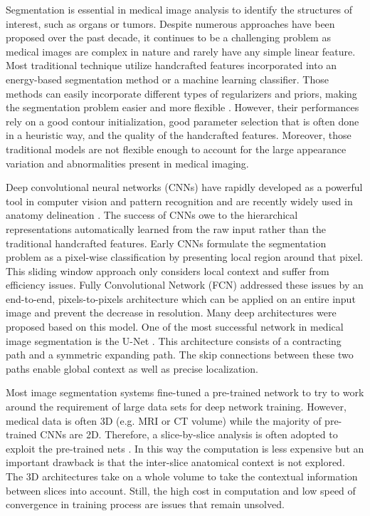 Segmentation is essential in medical image analysis to identify the structures of interest, such as organs or tumors.
Despite numerous approaches have been proposed over the past decade, it continues to be a challenging problem as medical images are complex in nature and rarely have any simple linear feature. 
Most traditional technique \cite{Boykov06GC,Caselles97geodesics,ChanVese01regions} utilize handcrafted features incorporated into an energy-based segmentation method or a machine learning classifier. Those methods can easily incorporate different types of regularizers and priors, making the segmentation problem easier and more flexible \cite{Cremers-et-al-ijcv07}. However, their performances rely on a good contour initialization, good parameter selection that is often done in a heuristic way, and the quality of the handcrafted features. Moreover, those traditional models are not flexible enough to account for the large appearance variation and abnormalities present in medical imaging. 

Deep convolutional neural networks (CNNs) have rapidly developed as a powerful tool in computer vision and pattern recognition and are recently widely used in anatomy delineation \cite{litjens2017survey}. The success of CNNs owe to the hierarchical representations automatically learned from the raw input rather than the traditional handcrafted features. 
Early CNNs formulate the segmentation problem as a pixel-wise classification by presenting local region around that pixel. This sliding window approach only considers local context and suffer from efficiency issues.
Fully Convolutional Network (FCN) \cite{long2015fully} addressed these issues by an end-to-end, pixels-to-pixels architecture which can be applied on an entire input image and prevent the decrease in resolution. Many deep architectures were proposed based on this model. One of the most successful network in medical image segmentation is the U-Net \cite{ronneberger2015u}. This architecture consists of a contracting path and a symmetric expanding path. The skip connections between these two paths enable global context as well as precise localization. 

Most image segmentation systems fine-tuned a pre-trained network to try to work around the requirement of large data sets for deep network training. 
However, medical data is often 3D (e.g. MRI or CT volume) while the majority of pre-trained CNNs are 2D. Therefore, a slice-by-slice analysis is often adopted to exploit the pre-trained nets \cite{prasoon2013deep}. In this way the computation is less expensive but an important drawback is that the inter-slice anatomical context is not explored.
The 3D architectures \cite{cciccek20163d,milletari2016v} take on a whole volume to take the contextual information between slices into account. Still, the high cost in computation and low speed of convergence in training process are issues that remain unsolved.

